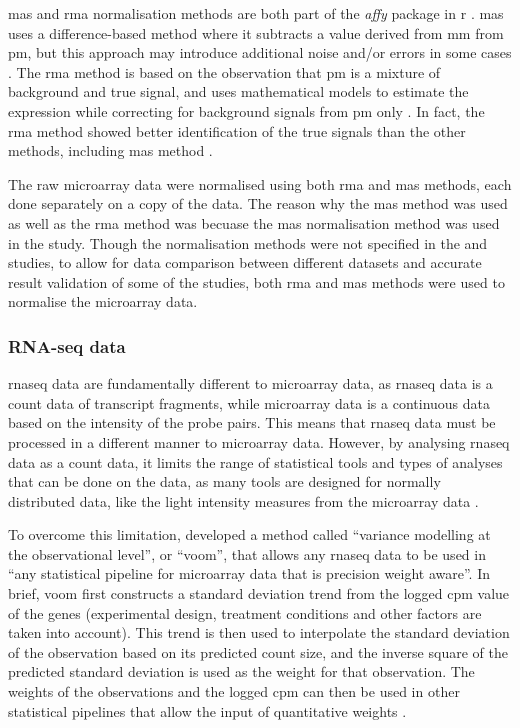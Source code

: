 \Gls{mas} and \gls{rma} normalisation methods are both part of the \textit{affy} package in \gls{r} \citep{Gautier2004}.
\Gls{mas} uses a difference-based method where it subtracts a value derived from \gls{mm} from \gls{pm}, but this approach may introduce additional noise and/or errors in some cases \citep{Irizarry2003}.
The \gls{rma} method is based on the observation that \gls{pm} is a mixture of background and true signal, and uses mathematical models to estimate the expression while correcting for background signals from \gls{pm} only \citep{Irizarry2003}.
In fact, the \gls{rma} method showed better identification of the true signals than the other methods, including \Gls{mas} method \citep{Irizarry2003}.

The raw microarray data were normalised using both \gls{rma} and \gls{mas} methods, each done separately on a copy of the data.
The reason why the \gls{mas} method was used as well as the \gls{rma} method was becuase the \gls{mas} normalisation method was used in the \citet{Gatza2010a} study.
Though the normalisation methods were not specified in the \citet{Creighton2012} and \citet{Fuentes-Mattei2014} studies, to allow for data comparison between different datasets and accurate result validation of some of the studies, both \gls{rma} and \gls{mas} methods were used to normalise the microarray data.

\subsubsection{RNA-seq data}
\label{ssub:rna_seq_data}

\gls{rnaseq} data are fundamentally different to microarray data, as \gls{rnaseq} data is a count data of transcript fragments, while microarray data is a continuous data based on the intensity of the probe pairs.
This means that \gls{rnaseq} data must be processed in a different manner to microarray data.
However, by analysing \gls{rnaseq} data as a count data, it limits the range of statistical tools and types of analyses that can be done on the data, as many tools are designed for normally distributed data, like the light intensity measures from the microarray data \citep{Law2014}.

To overcome this limitation, \citet{Law2014} developed a method called ``variance modelling at the observational level'', or ``voom'', that allows any \gls{rnaseq} data to be used in ``any statistical pipeline for microarray data that is precision weight aware''.
In brief, voom first constructs a standard deviation trend from the logged \gls{cpm} value of the genes (experimental design, treatment conditions and other factors are taken into account).
This trend is then used to interpolate the standard deviation of the observation based on its predicted count size, and the inverse square of the predicted standard deviation is used as the weight  for that observation.
The weights of the observations and the logged \gls{cpm} can then be used in other statistical pipelines that allow the input of quantitative weights \citep{Law2014}.


